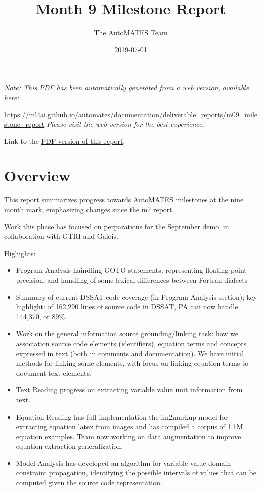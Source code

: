\documentclass[article, 12pt, oneside]{memoir}
\title{Month 9 Milestone Report}
\author{\href{https://ml4ai.github.io/automates/team/}{The AutoMATES Team}}
\date{2019-07-01}
\begin{document}
\maketitle
\tableofcontents*

\bigskip
\bigskip

\noindent \emph{Note: This PDF has been automatically generated from a web
  version, available here:}

  {
  \small
\noindent
\url{https://ml4ai.github.io/automates/documentation/deliverable_reports/m09_milestone_report}
}
\emph{Please visit the web version for the best experience.}

Link to the \href{ASKE_M0Report_UA-AutoMATES-20190701.pdf}{PDF version
of this report}.

\hypertarget{overview}{%
\section{Overview}\label{overview}}

This report summarizes progress towards AutoMATES milestones at the nine
month mark, emphasizing changes since the m7 report.

Work this phase has focused on perparations for the September demo, in
collaboration with GTRI and Galois.

Highights:

\begin{itemize}
\tightlist
\item
  Program Analysis haindling GOTO statements, representing floating
  point precision, and handling of some lexical differences between
  Fortran dialects
\item
  Summary of current DSSAT code coverage (in Program Analysis section);
  key highlight: of 162,290 lines of source code in DSSAT, PA can now
  handle 144,370, or 89\%.
\item
  Work on the general information source grounding/linking task: how we
  association source code elements (identifiers), equation terms and
  concepts expressed in text (both in comments and documentation). We
  have initial methods for linking some elements, with focus on linking
  equation terms to document text elements.
\item
  Text Reading progress on extracting variable value unit information
  from text.
\item
  Equation Reading has full implementation the im2markup model for
  extracting equation latex from images and has compiled a corpus of
  1.1M equation examples. Team now working on data augmentation to
  improve equation extraction generalization.
\item
  Model Analysis has developed an algorithm for variable value domain
  constraint propagation, identifying the possible intervals of values
  that can be computed given the source code representation.
\end{itemize}
\end{document}
